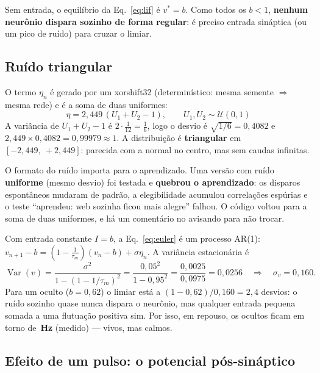 \documentclass[11pt,a4paper]{article}
\DeclareRobustCommand{\arq}[1]{\texttt{\detokenize{#1}}}
\begin{document}
Sem entrada, o equilíbrio da Eq.~\eqref{eq:lif} é $v^\ast = b$. Como todos os $b < 1$, \textbf{nenhum neurônio dispara sozinho
de forma regular}: é preciso entrada sináptica (ou um pico de ruído) para cruzar o limiar.

\subsection{Ruído triangular}\label{sec:ruido}

O termo $\eta_n$ é gerado por um xorshift32 (determinístico: mesma semente $\Rightarrow$ mesma rede) e é a soma de duas uniformes:
\begin{equation}
\eta = 2{,}449\,(U_1 + U_2 - 1), \qquad U_1, U_2 \sim \mathcal{U}(0,1)
\end{equation}
A variância de $U_1+U_2-1$ é $2 \cdot \tfrac{1}{12} = \tfrac16$, logo o desvio é $\sqrt{1/6} = 0{,}4082$ e $2{,}449 \times 0{,}4082 = 0{,}99979 \approx 1$.
A distribuição é \textbf{triangular} em $[-2{,}449,\ +2{,}449]$: parecida com a normal no centro, mas sem caudas infinitas.

\begin{atencao}
O formato do ruído importa para o aprendizado. Uma versão com ruído \textbf{uniforme} (mesmo desvio) foi testada e \textbf{quebrou
o aprendizado}: os disparos espontâneos mudaram de padrão, a elegibilidade acumulou correlações espúrias e o teste
“aprendeu: web sozinha ficou mais alegre” falhou. O código voltou para a soma de duas uniformes, e há um comentário no
\arq{zeus_snn.c} avisando para não trocar.
\end{atencao}

\begin{exemplo}
Com entrada constante $I = b$, a Eq.~\eqref{eq:euler} é um processo AR(1): $v_{n+1} - b = (1 - \tfrac{1}{\tau_m})(v_n - b) + \sigma\eta_n$.
A variância estacionária é
\[
\operatorname{Var}(v) = \frac{\sigma^2}{1-(1-1/\tau_m)^2} = \frac{0{,}05^2}{1-0{,}95^2} = \frac{0{,}0025}{0{,}0975} = 0{,}0256
\quad\Rightarrow\quad \sigma_v = 0{,}160 .
\]
Para um oculto ($b=0{,}62$) o limiar está a $(1-0{,}62)/0{,}160 = 2{,}4$ desvios: o ruído sozinho quase nunca dispara o neurônio,
mas qualquer entrada pequena somada a uma flutuação positiva sim. Por isso, em repouso, os ocultos ficam em torno de
\textbf{\vTaxaRep\,Hz} (medido) — vivos, mas calmos.
\end{exemplo}

\subsection{Efeito de um pulso: o potencial pós-sináptico}
\end{document}
